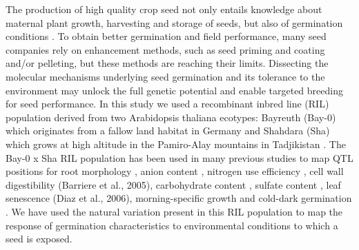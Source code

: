 \documentclass[8pt, twoside, a5paper]{report}
\begin{document}
The production of high quality crop seed not only entails knowledge about maternal plant growth, harvesting and storage of seeds, 
but also of germination conditions \cite{Rivero-Lepinckas:2006}. To obtain better germination and field performance, many seed 
companies rely on enhancement methods, such as seed priming and coating and/or pelleting, but these methods are reaching their 
limits. Dissecting the molecular mechanisms underlying seed germination and its tolerance to the environment may unlock the full 
genetic potential and enable targeted breeding for seed performance. In this study we used a recombinant inbred line (RIL) population 
derived from two Arabidopsis thaliana ecotypes: Bayreuth (Bay-0) which originates from a fallow land habitat in Germany and Shahdara 
(Sha) which grows at high altitude in the Pamiro-Alay mountains in Tadjikistan \cite{Loudet:2002}. The Bay-0 x Sha RIL population 
has been used in many previous studies to map QTL positions for root morphology \cite{Loudet:2005, Reymond:2006}, anion 
content \cite{Loudet:2003a}, nitrogen use efficiency \cite{Loudet:2003b}, cell wall digestibility (Barriere et al., 2005), 
carbohydrate content \cite{Calenge:2006}, sulfate content \cite{Loudet:2007}, leaf senescence (Diaz et al., 2006), 
morning-specific growth \cite{Loudet:2008} and cold-dark germination \cite{Meng:2008}. We have used the natural variation 
present in this RIL population to map the response of germination characteristics to environmental conditions to which a seed is exposed.
\end{document}
